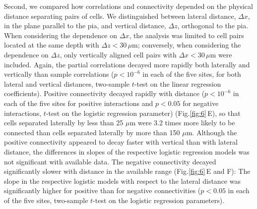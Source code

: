 \documentclass[10pt]{article}
\newcommand{\figref}[2]{Fig.\;\ref{fig:#1}\,#2}
\begin{document}
Second, we compared how correlations and connectivity depended on the physical distance separating pairs of cells. We distinguished between lateral distance, $\Delta x$, in the plane parallel to the pia, and vertical distance, $\Delta z$, orthogonal to the pia.  When considering the dependence on $\Delta x$, the analysis was limited to cell pairs located at the same depth with $\Delta z < 30\,\mu\mbox{m}$; conversely, when considering the dependence on $\Delta z$, only vertically aligned cell pairs with $\Delta x < 30\,\mu\mbox{m}$ were included. Again, the partial correlations decayed more rapidly both laterally and vertically than sample correlations ($p<10^{-6}$ in each of the five sites, for both lateral and vertical distances, two-sample $t$-test on the linear regression coefficients). 
Positive connectivity decayed rapidly with distance ($p<10^{-6}$ in each of the five sites for positive interactions and $p<0.05$ for negative interactions, $t$-test on the logistic regression parameter) (\figref{6}{E}), so that cells separated laterally by less than 25 $\mu\mbox{m}$ were 3.2 times more likely to be connected than cells separated laterally by more than 150 $\mu\mbox{m}$. Although the positive connectivity appeared to decay faster with vertical than with lateral distance, the differences in slopes of the respective logistic regression models was not significant with available data. The negative connectivity decayed significantly slower with distance in the available range (\figref{6}{E and F}): The slope in the respective logistic models with respect to the lateral distance was significantly higher for positive than for negative connectivities ($p<0.05$ in each of the five sites, two-sample $t$-test on the logistic regression parameters). 
\end{document}
